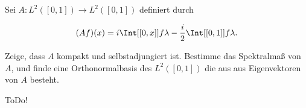 \begin{exercise}[37/2]

Sei $A: L^2([0, 1]) \to L^2([0, 1])$ definiert durch

\begin{align*}
  (A f)(x)
  =
  i
  \Int[{[0, x]}]{f}{\lambda}
  - \frac{i}{2}
  \Int[{[0, 1]}]{f}{\lambda}.
\end{align*}

Zeige, dass $A$ kompakt und selbstadjungiert ist.
Bestimme das Spektralmaß von $A$, und finde eine Orthonormalbasis des $L^2([0, 1])$ die aus aus Eigenvektoren von $A$ besteht.

\end{exercise}

\begin{solution}

ToDo!

\end{solution}
